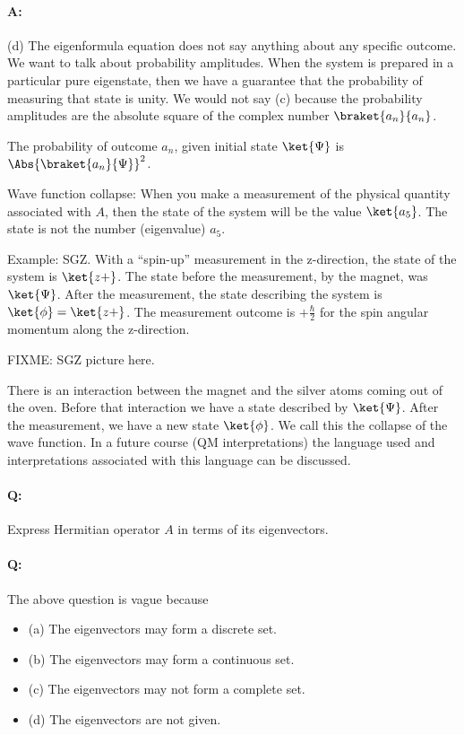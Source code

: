 \paragraph{A:} (d) The eigenformula equation does not say anything about any specific outcome.  We want to talk about probability amplitudes.  When the system is prepared in a particular pure eigenstate, then we have a guarantee that the probability of measuring that state is unity.  We would not say (c) because the probability amplitudes are the absolute square of the complex number $\braket{a_n}{a_n}$.

The probability of outcome $a_n$, given initial state $\ket{\Psi}$ is $\Abs{\braket{a_n}{\Psi}}^2$.

Wave function collapse:  When you make a measurement of the physical quantity associated with $A$, then the state of the system will be the value $\ket{a_5}$.  The state is not the number (eigenvalue) $a_5$.

Example: SGZ.  With a ``spin-up'' measurement in the z-direction, the state of the system is $\ket{z+}$.  The state before the measurement, by the magnet, was $\ket{\Psi}$.  After the measurement, the state describing the system is $\ket{\phi} = \ket{z+}$.  The measurement outcome is $+\frac{\hbar}{2}$ for the spin angular momentum along the z-direction.

FIXME: SGZ picture here.

There is an interaction between the magnet and the silver atoms coming out of the oven.  Before that interaction we have a state described by $\ket{\Psi}$.  After the measurement, we have a new state $\ket{\phi}$.  We call this the collapse of the wave function.  In a future course (QM interpretations) the language used and interpretations associated with this language can be discussed.

\paragraph{Q:} Express Hermitian operator $A$ in terms of its eigenvectors.
\paragraph{Q:} The above question is vague because

\begin{itemize}
\item (a) The eigenvectors may form a discrete set.
\item (b) The eigenvectors may form a continuous set.
\item (c) The eigenvectors may not form a complete set.
\item (d) The eigenvectors are not given.
\end{itemize}

